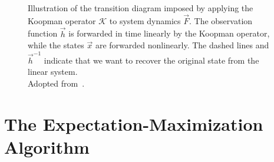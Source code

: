 	\begin{figure}
		\centering
		\tikzKoopmanOperator
		\caption{Illustration of the transition diagram imposed by applying the Koopman operator \( \mathcal{K} \) to system dynamics \( \vec{F} \). The observation function \( \vec{h} \) is forwarded in time linearly by the Koopman operator, while the states \(\vec{x}\) are forwarded nonlinearly. The dashed lines and \( \vec{h}^{-1} \) indicate that we want to recover the original state from the linear system. \\ Adopted from~\cite{bruntonKoopmanInvariantSubspaces2016}.}
		\label{fig:koopman}
	\end{figure}

\section{The Expectation-Maximization Algorithm}
	\label{sec:em}

